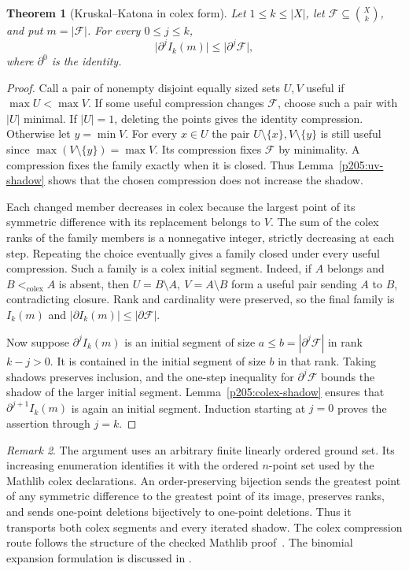 \documentclass[11pt,oneside,openany]{book}
\theoremstyle{plain}
\newtheorem{theorem}{Theorem}[chapter]
\theoremstyle{definition}
\theoremstyle{remark}
\newtheorem{remark}[theorem]{Remark}
\begin{document}
\begin{theorem}[Kruskal--Katona in colex form]\label{p205:W09}
Let \(1\le k\le |X|\), let \(\mathcal F\subseteq\binom Xk\), and
put \(m=|\mathcal F|\). For every \(0\le j\le k\),
\[
   \bigl|\partial^j I_k(m)\bigr|\le\bigl|\partial^j\mathcal F\bigr|,
\]
where \(\partial^0\) is the identity.
\end{theorem}
\begin{proof}
Call a pair of nonempty disjoint equally sized sets \(U,V\) useful
if \(\max U<\max V\). If some useful compression changes
\(\mathcal F\), choose such a pair with \(|U|\) minimal. If
\(|U|=1\), deleting the points gives the identity compression.
Otherwise let \(y=\min V\). For every \(x\in U\) the pair
\(U\setminus\{x\}, V\setminus\{y\}\) is still useful since
\(\max(V\setminus\{y\})=\max V\). Its compression fixes
\(\mathcal F\) by minimality. A compression fixes the family
exactly when it is closed. Thus Lemma~\ref{p205:uv-shadow}
shows that the chosen compression does not increase the shadow.

Each changed member decreases in colex because the largest point
of its symmetric difference with its replacement belongs to \(V\).
The sum of the colex ranks of the family members is a nonnegative
integer, strictly decreasing at each step. Repeating the choice
eventually gives a family closed under every useful compression.
Such a family is a colex initial segment. Indeed, if \(A\) belongs
and \(B<_{\mathrm{colex}}A\) is absent, then
\(U=B\setminus A,\ V=A\setminus B\) form a useful pair sending
\(A\) to \(B\), contradicting closure. Rank and cardinality
were preserved, so the final family is \(I_k(m)\) and
\(|\partial I_k(m)|\le|\partial\mathcal F|\).

Now suppose \(\partial^j I_k(m)\) is an initial segment of size
\(a\le b=|\partial^j\mathcal F|\) in rank \(k-j>0\).
It is contained in the initial segment of size \(b\) in that rank.
Taking shadows preserves inclusion, and the one-step inequality
for \(\partial^j\mathcal F\) bounds the shadow of the larger
initial segment. Lemma~\ref{p205:colex-shadow} ensures that
\(\partial^{j+1} I_k(m)\) is again an initial segment. Induction
starting at \(j=0\) proves the assertion through \(j=k\).
\end{proof}

\begin{remark}
The argument uses an arbitrary finite linearly ordered ground set.
Its increasing enumeration identifies it with the ordered \(n\)-point
set used by the Mathlib colex declarations. An order-preserving
bijection sends the greatest point of any symmetric difference
to the greatest point of its image, preserves ranks, and sends
one-point deletions bijectively to one-point deletions.
Thus it transports both colex segments and every iterated shadow.
The colex compression route follows the structure of the checked
Mathlib proof~\cite{mathlib}. The binomial expansion formulation
is discussed in \cite[Section~10.4]{jukna}.
\end{remark}
\end{document}

